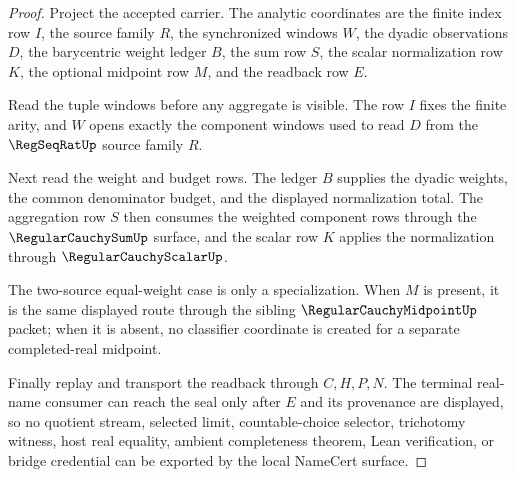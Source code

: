 \begin{proof}
Project the accepted carrier. The analytic coordinates are the finite index row $I$, the source family $R$, the synchronized windows $W$, the dyadic observations $D$, the barycentric weight ledger $B$, the sum row $S$, the scalar normalization row $K$, the optional midpoint row $M$, and the readback row $E$.

Read the tuple windows before any aggregate is visible. The row $I$ fixes the finite arity, and $W$ opens exactly the component windows used to read $D$ from the $\RegSeqRatUp$ source family $R$.

Next read the weight and budget rows. The ledger $B$ supplies the dyadic weights, the common denominator budget, and the displayed normalization total. The aggregation row $S$ then consumes the weighted component rows through the $\RegularCauchySumUp$ surface, and the scalar row $K$ applies the normalization through $\RegularCauchyScalarUp$.

The two-source equal-weight case is only a specialization. When $M$ is present, it is the same displayed route through the sibling $\RegularCauchyMidpointUp$ packet; when it is absent, no classifier coordinate is created for a separate completed-real midpoint.

Finally replay and transport the readback through $C,H,P,N$. The terminal real-name consumer can reach the seal only after $E$ and its provenance are displayed, so no quotient stream, selected limit, countable-choice selector, trichotomy witness, host real equality, ambient completeness theorem, Lean verification, or bridge credential can be exported by the local NameCert surface.
\end{proof}

